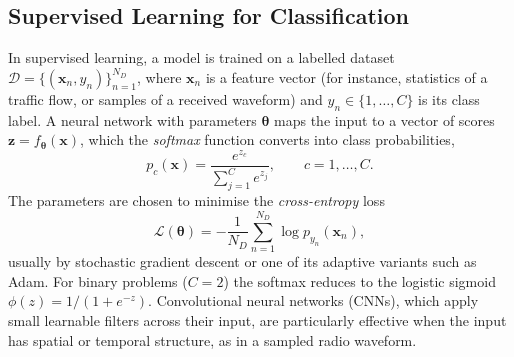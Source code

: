 \subsection{Supervised Learning for Classification}
In supervised learning, a model is trained on a labelled dataset $\mathcal{D}=\{(\mathbf{x}_n,y_n)\}_{n=1}^{N_D}$, where $\mathbf{x}_n$ is a feature vector (for instance, statistics of a traffic flow, or samples of a received waveform) and $y_n\in\{1,\dots,C\}$ is its class label. A neural network with parameters $\boldsymbol{\theta}$ maps the input to a vector of scores $\mathbf{z}=f_{\boldsymbol{\theta}}(\mathbf{x})$, which the \emph{softmax} function converts into class probabilities,
\begin{equation}
  p_c(\mathbf{x}) = \frac{e^{z_c}}{\sum_{j=1}^{C} e^{z_j}}, \qquad c=1,\dots,C.
  \label{eq:ml_softmax}
\end{equation}
The parameters are chosen to minimise the \emph{cross-entropy} loss
\begin{equation}
  \mathcal{L}(\boldsymbol{\theta}) = -\frac{1}{N_D}\sum_{n=1}^{N_D}\log p_{y_n}(\mathbf{x}_n),
  \label{eq:ml_crossentropy}
\end{equation}
usually by stochastic gradient descent or one of its adaptive variants such as Adam. For binary problems ($C=2$) the softmax reduces to the logistic sigmoid $\phi(z)=1/(1+e^{-z})$. Convolutional neural networks (CNNs), which apply small learnable filters across their input, are particularly effective when the input has spatial or temporal structure, as in a sampled radio waveform.

